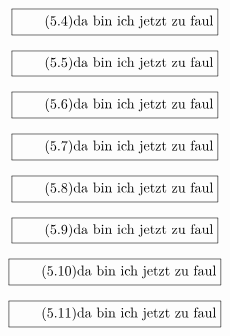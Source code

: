 \documentclass[11pt]{article}
\newcommand{\1}{ {\mathds{1}} }
\begin{document}
    \begin{equation}
      \boxed{
        \tag{5.4}
        \begin{split}
          \text{da bin ich jetzt zu faul}
        \end{split}
      }
    \end{equation}
    
    \begin{equation}
      \boxed{
        \tag{5.5}
        \begin{split}
          \text{da bin ich jetzt zu faul}
        \end{split}
      }
    \end{equation}

    \begin{equation}
      \boxed{
        \tag{5.6}
        \begin{split}
          \text{da bin ich jetzt zu faul}
        \end{split}
      }
    \end{equation}

    \begin{equation}
      \boxed{
        \tag{5.7}
        \begin{split}
          \text{da bin ich jetzt zu faul}
        \end{split}
      }
    \end{equation}

    \begin{equation}
      \boxed{
        \tag{5.8}
        \begin{split}
          \text{da bin ich jetzt zu faul}
        \end{split}
      }
    \end{equation}

    \begin{equation}
      \boxed{
        \tag{5.9}
        \begin{split}
          \text{da bin ich jetzt zu faul}
        \end{split}
      }
    \end{equation}

    \begin{equation}
      \boxed{
        \tag{5.10}
        \begin{split}
          \text{da bin ich jetzt zu faul}
        \end{split}
      }
    \end{equation}

    \begin{equation}
      \boxed{
        \tag{5.11}
        \begin{split}
          \text{da bin ich jetzt zu faul}
        \end{split}
      }
    \end{equation}
\end{document}
